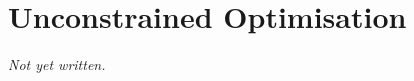 \chapter{Unconstrained Optimisation}\label{ch:unconstrained-optimisation}


\textit{Not yet written.}
